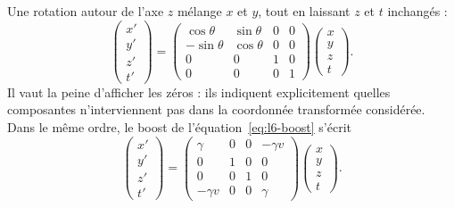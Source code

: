\begin{classroomqa}\end{classroomqa}

Une rotation autour de l’axe \(z\) mélange \(x\) et \(y\), tout en laissant \(z\) et \(t\) inchangés : \begin{equation}
\begin{pmatrix}
  x'\\ y'\\ z'\\ t'
\end{pmatrix}
=
\begin{pmatrix}
  \cos\theta & \sin\theta & 0 & 0\\
  -\sin\theta & \cos\theta & 0 & 0\\
  0 & 0 & 1 & 0\\
  0 & 0 & 0 & 1
\end{pmatrix}
\begin{pmatrix}
  x\\ y\\ z\\ t
\end{pmatrix}.
\end{equation} Il vaut la peine d’afficher les zéros : ils indiquent explicitement quelles composantes n’interviennent pas dans la coordonnée transformée considérée. Dans le même ordre, le boost de l’équation~\eqref{eq:l6-boost} s’écrit \begin{equation}
\begin{pmatrix}
  x'\\ y'\\ z'\\ t'
\end{pmatrix}
=
\begin{pmatrix}
  \gamma & 0 & 0 & -\gamma v\\
  0 & 1 & 0 & 0\\
  0 & 0 & 1 & 0\\
  -\gamma v & 0 & 0 & \gamma
\end{pmatrix}
\begin{pmatrix}
  x\\ y\\ z\\ t
\end{pmatrix}.
\end{equation}

